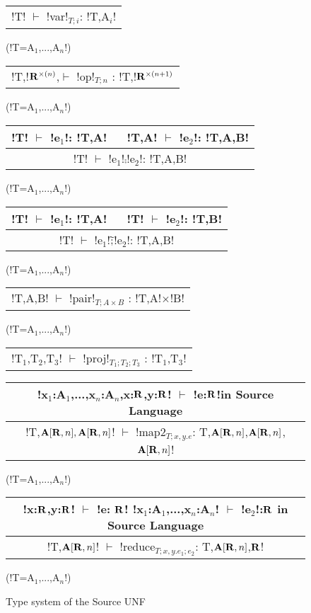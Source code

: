\begin{figure*}[tb]
    \centering
    \begin{tabular}{c} 
    \\\hline
    !T! $\vdash$ !var!$_{T;i}$: !T,A$_i$!
    \end{tabular}(!T=A$_{1}$,...,A$_n$!)
    \hspace{0.5cm}
    \begin{tabular}{c}
        \\\hline
        !T,!$\mathbf{R}^{\times(n)}$,$\vdash$ !op!$_{T;n}$ : !T,!$\mathbf{R}^{\times(n+1)}$
    \end{tabular}(!T=A$_{1}$,...,A$_n$!)

    \begin{tabular}{c}
    !T! $\vdash$ !e$_{1}$!: !T,A! $\quad$ !T,A! $\vdash$ !e$_{2}$!: !T,A,B! \\\hline
    !T! $\vdash$ !e$_{1}$!$\comp$!e$_{2}$!: !T,A,B!
    \end{tabular}(!T=A$_{1}$,...,A$_n$!)
    \hspace{0.5cm}
    \begin{tabular}{c}
        !T! $\vdash$ !e$_{1}$!: !T,A! $\quad$ !T! $\vdash$ !e$_{2}$!: !T,B! \\\hline
        !T! $\vdash$ !e$_{1}$!$\widetilde{;}$!e$_{2}$!: !T,A,B!
    \end{tabular}(!T=A$_{1}$,...,A$_n$!)

    \begin{tabular}{c}
        \\\hline
        !T,A,B! $\vdash$ !pair!$_{T;A\times B}$ : !T,A!$\times$!B!
    \end{tabular}(!T=A$_{1}$,...,A$_n$!)

    \begin{tabular}{c}
        \\\hline
        !T$_{1}$,T$_{2}$,T$_{3}$! $\vdash$ !proj!$_{T_1;T_2;T_3}$ : !T$_{1}$,T$_{3}$!
    \end{tabular}

    \begin{tabular}{c}
        !x$_{1}$:A$_{1}$,...,x$_n$:A$_n$,x:$\mathbf{R}$,y:$\mathbf{R}$! $\vdash$ !e:$\mathbf{R}$!\quad in Source Language
        \\\hline  
        !T,$\mathbf{A}[\mathbf{R},n],\mathbf{A}[\mathbf{R},n]$! $\vdash$ !map2$_{T; x,y.e}$: T,$\mathbf{A}[\mathbf{R},n]$,$\mathbf{A}[\mathbf{R},n]$,$\mathbf{A}[\mathbf{R},n]$!
    \end{tabular}(!T=A$_{1}$,...,A$_n$!)

    \begin{tabular}{c}
        !x:$\mathbf{R}$,y:$\mathbf{R}$! $\vdash$ !e: $\mathbf{R}$! \quad !x$_{1}$:A$_{1}$,...,x$_n$:A$_n$! $\vdash$ !e$_{2}$!:$\mathbf{R}$ \quad in Source Language
        \\\hline  
        !T,$\mathbf{A}[\mathbf{R},n]$! $\vdash$ !reduce$_{T; x,y.e_1; e_2}$: T,$\mathbf{A}[\mathbf{R},n]$,$\mathbf{R}$!
    \end{tabular}(!T=A$_{1}$,...,A$_n$!)
    \vspace{-0.2cm}
    \caption{Type system of the Source UNF}
    \vspace{-0.4cm}
    \label{fig:source_unf_typesystem}
\end{figure*}